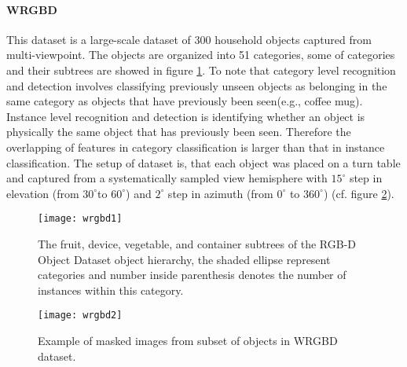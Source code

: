 \paragraph{WRGBD\cite{lai2011large}} This dataset is a large-scale dataset of 300 household objects captured from multi-viewpoint. The objects are organized into 51 categories, some of categories and their subtrees are showed in figure \ref{fig:wrgbd1}. To note that category level recognition and detection involves classifying previously unseen objects as belonging in the same category as objects that have previously been seen(e.g., coffee
mug). Instance level recognition and detection is identifying
whether an object is physically the same object that has
previously been seen. Therefore the overlapping of features in category classification is larger than that in instance classification. The setup of dataset is, that each object was placed on a turn table and captured from a systematically sampled view hemisphere with $15^{\circ}$ step in elevation (from $30^{\circ}$to $60^{\circ}$) and $2^\circ$ step in azimuth (from $0^\circ$ to $360^\circ$) (cf. figure \ref{fig:wrgbd2}).
\begin{figure}[h!]
	\begin{center}
		\texttt{[image: wrgbd1]}
		\caption{The fruit, device, vegetable, and container subtrees of the RGB-D Object Dataset object hierarchy, the shaded ellipse represent categories and number inside parenthesis denotes the number of instances within this category\cite{lai2011large}.}		
		\label{fig:wrgbd1}
	\end{center}
\end{figure}
 \begin{figure}[h!]
 	\begin{center}
 		\texttt{[image: wrgbd2]}
 		\caption{Example of masked images from subset of objects in WRGBD dataset.}		
 		\label{fig:wrgbd2}
 	\end{center}
 \end{figure}
 


